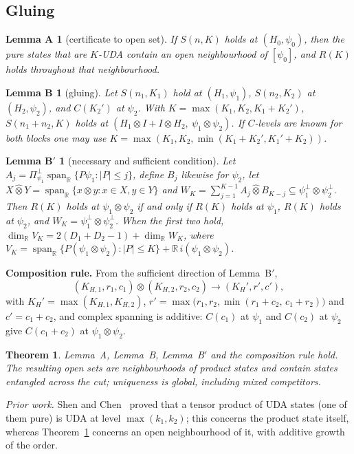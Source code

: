 \documentclass[aps,pra,onecolumn,superscriptaddress,nofootinbib,longbibliography,10pt]{revtex4-2}
\newtheorem{theorem}{Theorem}
\newtheorem*{lemA}{Lemma A}
\newtheorem*{lemB}{Lemma B}
\newtheorem*{lemBp}{Lemma B$'$}
\theoremstyle{definition}
\newcommand{\RR}{\mathbb R}
\newcommand{\spanR}{\operatorname{span}_{\RR}}
\begin{document}
\subsection{Gluing}
\begin{lemA}[certificate to open set]
If $S(n,K)$ holds at $(H_0,\psi_0)$, then the pure states that are $K$-UDA contain an open neighbourhood of $[\psi_0]$, and $R(K)$ holds throughout that neighbourhood.
\end{lemA}
\begin{lemB}[gluing]
Let $S(n_1,K_1)$ hold at $(H_1,\psi_1)$, $S(n_2,K_2)$ at $(H_2,\psi_2)$, and $C(K_2')$ at $\psi_2$. With $K=\max(K_1,K_2,K_1+K_2')$, $S(n_1+n_2,K)$ holds at $(H_1\otimes I+I\otimes H_2,\ \psi_1\otimes\psi_2)$. If $C$-levels are known for both blocks one may use $K=\max(K_1,K_2,\min(K_1+K_2',K_1'+K_2))$.
\end{lemB}
\begin{lemBp}[necessary and sufficient condition]
Let $A_j=\Pi^\perp_{\psi_1}\spanR\{P\psi_1:|P|\le j\}$, define $B_j$ likewise for $\psi_2$, let $X\hat\otimes Y=\spanR\{x\otimes y:x\in X,y\in Y\}$ and $W_K=\sum_{j=1}^{K-1}A_j\hat\otimes B_{K-j}\subseteq\psi_1^\perp\otimes\psi_2^\perp$. Then $R(K)$ holds at $\psi_1\otimes\psi_2$ if and only if $R(K)$ holds at $\psi_1$, $R(K)$ holds at $\psi_2$, and $W_K=\psi_1^\perp\otimes\psi_2^\perp$. When the first two hold, $\dim_{\RR}V_K=2(D_1+D_2-1)+\dim_{\RR}W_K$, where $V_K=\spanR\{P(\psi_1\otimes\psi_2):|P|\le K\}+\RR\,i(\psi_1\otimes\psi_2)$.
\end{lemBp}
\noindent \textbf{Composition rule.} From the sufficient direction of Lemma~B$'$,
\[
(K_{H,1},r_1,c_1)\otimes(K_{H,2},r_2,c_2)\to(K_H',r',c'),
\]
with $K_H'=\max(K_{H,1},K_{H,2})$, $r'=\max\big(r_1,r_2,\min(r_1+c_2,\,c_1+r_2)\big)$ and $c'=c_1+c_2$,
and complex spanning is additive: $C(c_1)$ at $\psi_1$ and $C(c_2)$ at $\psi_2$ give $C(c_1+c_2)$ at $\psi_1\otimes\psi_2$.

\begin{theorem}\label{thm:glue}
Lemma~A, Lemma~B, Lemma~B$'$ and the composition rule hold. The resulting open sets are neighbourhoods of product states and contain states entangled across the cut; uniqueness is global, including mixed competitors.
\end{theorem}
\noindent \emph{Prior work.} Shen and Chen~\cite{SC23} proved that a tensor product of UDA states (one of them pure) is UDA at level $\max(k_1,k_2)$; this concerns the product state itself, whereas Theorem~\ref{thm:glue} concerns an open neighbourhood of it, with additive growth of the order.
\end{document}
